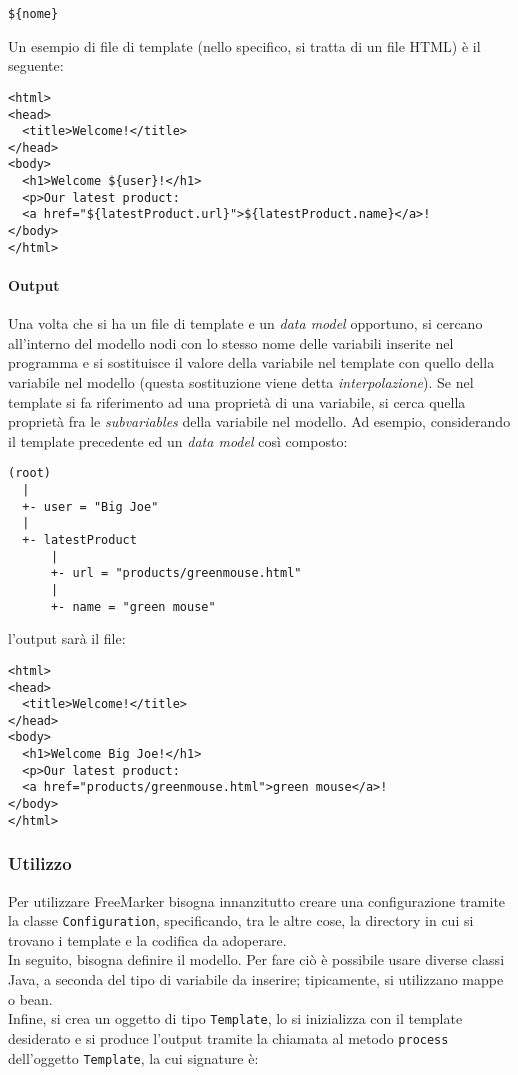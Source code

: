 \begin{lstlisting}
${nome}
\end{lstlisting}

Un esempio di file di template (nello specifico, si tratta di un file HTML) è il seguente:

\begin{lstlisting}
<html>
<head>
  <title>Welcome!</title>
</head>
<body>
  <h1>Welcome ${user}!</h1>
  <p>Our latest product:
  <a href="${latestProduct.url}">${latestProduct.name}</a>!
</body>
</html>
\end{lstlisting}

\paragraph{Output}
Una volta che si ha un file di template e un \textit{data model} opportuno, si cercano all'interno del modello nodi con lo stesso nome delle variabili inserite nel programma e si sostituisce il valore della variabile nel template con quello della variabile nel modello (questa sostituzione viene detta \textsl{interpolazione}). Se nel template si fa riferimento ad una proprietà di una variabile, si cerca quella proprietà fra le \textit{subvariables} della variabile nel modello. Ad esempio, considerando il template precedente ed un \textit{data model} così composto:

\begin{lstlisting}
(root)
  |
  +- user = "Big Joe"
  |
  +- latestProduct
      |
      +- url = "products/greenmouse.html"
      |
      +- name = "green mouse"  
\end{lstlisting}

l'output sarà il file:

\begin{lstlisting}
<html>
<head>
  <title>Welcome!</title>
</head>
<body>
  <h1>Welcome Big Joe!</h1>
  <p>Our latest product:
  <a href="products/greenmouse.html">green mouse</a>!
</body>
</html>
\end{lstlisting}

\subsubsection{Utilizzo}
Per utilizzare FreeMarker bisogna innanzitutto creare una configurazione tramite la classe \lstinline{Configuration}, specificando, tra le altre cose, la directory in cui si trovano i template e la codifica da adoperare.\\
In seguito, bisogna definire il modello. Per fare ciò è possibile usare diverse classi Java, a seconda del tipo di variabile da inserire; tipicamente, si utilizzano mappe o bean.\\
Infine, si crea un oggetto di tipo \lstinline{Template}, lo si inizializza con il template desiderato e si produce l'output tramite la chiamata al metodo \lstinline{process} dell'oggetto \lstinline{Template}, la cui signature è:


